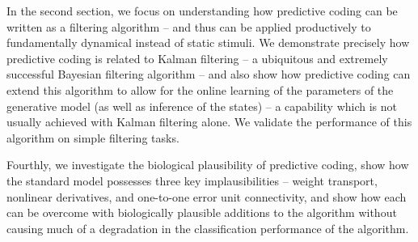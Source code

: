 In the second section, we focus on understanding how predictive coding can be written as a filtering algorithm -- and thus can be applied productively to fundamentally dynamical instead of static stimuli. We demonstrate precisely how predictive coding is related to Kalman filtering -- a ubiquitous and extremely successful Bayesian filtering algorithm \citep{kalman1960contributions,kalman1961new} -- and also show how predictive coding can extend this algorithm to allow for the online learning of the parameters of the generative model (as well as inference of the states) -- a capability which is not usually achieved with Kalman filtering alone. We validate the performance of this algorithm on simple filtering tasks.

Fourthly, we investigate the biological plausibility of predictive coding, show how the standard model possesses three key implausibilities -- weight transport, nonlinear derivatives, and one-to-one error unit connectivity, and show how each can be overcome with biologically plausible additions to the algorithm without causing much of a degradation in the classification performance of the algorithm.


